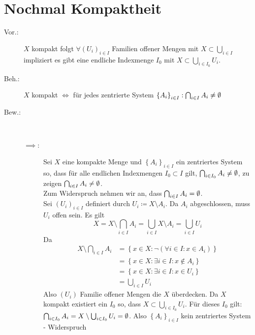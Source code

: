 \documentclass[sectionformat=aufgabe]{gadsescript}
\begin{document}
\section{Nochmal Kompaktheit}
\begin{description}
	\item[Vor.:] $ X $ kompakt folgt $ \forall (U_i)_{i \in I}  $ Familien offener Mengen mit $ X \subset \bigcup_{i \in  I} $ impliziert es gibt eine endliche Indexmenge $ I_0 $ mit $ X \subset \bigcup_{i \in  I_0} U_i $.
	\item[Beh.:] $ X $ kompakt $ \iff  $ für jedes zentrierte System $ \left\{ A_i \right\} _{i \in I} : \bigcap_{i \in I} A_i \neq \emptyset  $ 
	\item[Bew.:] ~
		\begin{description}
			\item[$ \implies  $:] Sei $ X $ eine kompakte Menge und $ \left\{ A_i \right\} _{i \in I}  $ ein zentriertes System so, dass für alle endlichen Indexmengen $ I_0 \subset I $ gilt, $ \bigcap_{i \in I_0} A_i \neq \emptyset  $, zu zeigen $ \bigcap_{i \in  I} A_i \neq \emptyset  $.\\
				Zum Widerspruch nehmen wir an, dass $ \bigcap_{i \in I} A_i = \emptyset  $.\\
				Sei $ (U_i)_{i \in I}  $ definiert durch $ U_i \coloneqq X \setminus A_i $.
				Da $ A_i $ abgeschlossen, muss $ U_i $ offen sein. Es gilt
				\[
					X = X \setminus \bigcap_{i \in  I} A_i = \bigcup_{i \in  I} X \setminus A_i = \bigcup_{i \in  I} U_i
				\]
				Da 
				\begin{align*}
					X \setminus \bigcap_{i \in  I} A_i &= \left\{ x \in X : \neg \left( \forall i \in I : x \in  A_i \right)  \right\} \\
									   &= \left\{ x \in X : \exists i \in I : x \not\in A_i \right\} \\
									   &= \left\{ x \in X : \exists i \in I : x \in U_i \right\} \\
									   &= \bigcup_{i \in  I} U_i
				\end{align*}
				Also $ (U_i) $ Familie offener Mengen die $ X $ überdecken. Da $ X $ kompakt existiert ein $ I_0 $ so, dass 
				$ X \subset \bigcup_{i \in I_0} U_i $.
				Für dieses $ I_0 $ gilt: $ \bigcap_{i \in I_0} A_i = X \setminus \bigcup_{i \in I_0} U_i = \emptyset  $.
				Also $ \left\{ A_i \right\} _{i \in I}  $ kein zentriertes System - Widerspruch
				

\end{description}
\end{description}
\end{document}
